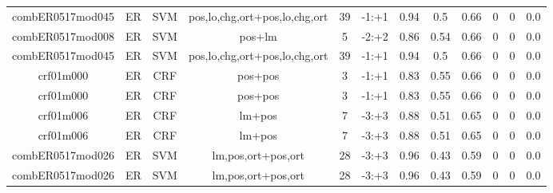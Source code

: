 \documentclass[a4paper]{article}
\begin{document}
\begin{landscape}
\begin{center}
\begin{tabular}{ |c|c|c|c|c|c|c|c|c|c|c|c|}
 	
 
 	
 		
 		\small{ combER0517mod045 } & ER & SVM & pos,lo,chg,ort+pos,lo,chg,ort  &  39 &  -1:+1  &  0.94 & 0.5 & 0.66  &  0 & 0 & 0.0 \\
 		

 	
 
 	
 		
 		\small{ combER0517mod008 } & ER & SVM & pos+lm  &  5 &  -2:+2  &  0.86 & 0.54 & 0.66  &  0 & 0 & 0.0 \\
 		

 	
 
 	
 		
 		\small{ combER0517mod045 } & ER & SVM & pos,lo,chg,ort+pos,lo,chg,ort  &  39 &  -1:+1  &  0.94 & 0.5 & 0.66  &  0 & 0 & 0.0 \\
 		

 	
 
 	
 		
 		\small{ crf01m000 } & ER & CRF & pos+pos  &  3 &  -1:+1  &  0.83 & 0.55 & 0.66  &  0 & 0 & 0.0 \\
 		

 	
 
 	
 		
 		\small{ crf01m000 } & ER & CRF & pos+pos  &  3 &  -1:+1  &  0.83 & 0.55 & 0.66  &  0 & 0 & 0.0 \\
 		

 	
 
 	
 		
 		\small{ crf01m006 } & ER & CRF & lm+pos  &  7 &  -3:+3  &  0.88 & 0.51 & 0.65  &  0 & 0 & 0.0 \\
 		

 	
 
 	
 		
 		\small{ crf01m006 } & ER & CRF & lm+pos  &  7 &  -3:+3  &  0.88 & 0.51 & 0.65  &  0 & 0 & 0.0 \\
 		

 	
 
 	
 		
 		\small{ combER0517mod026 } & ER & SVM & lm,pos,ort+pos,ort  &  28 &  -3:+3  &  0.96 & 0.43 & 0.59  &  0 & 0 & 0.0 \\
 		

 	
 
 	
 		
 		\small{ combER0517mod026 } & ER & SVM & lm,pos,ort+pos,ort  &  28 &  -3:+3  &  0.96 & 0.43 & 0.59  &  0 & 0 & 0.0 \\
 		


\end{tabular}
\end{center}
\end{landscape}
\end{document}
